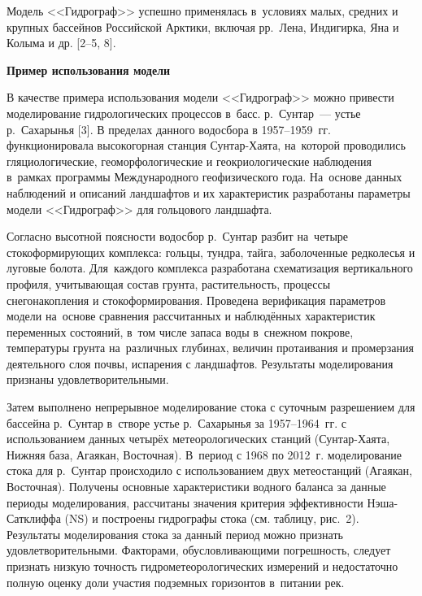 Модель <<Гидрограф>> успешно применялась в~условиях малых, средних и крупных бассейнов Российской Арктики, включая рр.~Лена, Индигирка, Яна и Колыма и др. [2--5, 8].\enlargethispage{\baselineskip}

\textbf{Пример использования модели}

В качестве примера использования модели <<Гидрограф>> можно привести моделирование гидрологических процессов в~басс.  р.~Сунтар~--- устье р.~Сахарынья [3]. В пределах данного водосбора в 1957--1959~гг. функционировала высокогорная станция Сунтар-Хаята, на~которой проводились гляциологические, геоморфологические и геокриологические наблюдения в~рамках программы Международного геофизического года. На~основе данных наблюдений и описаний ландшафтов и их характеристик разработаны параметры модели <<Гидрограф>> для гольцового ландшафта.

Согласно высотной поясности водосбор р.~Сунтар разбит на~четыре стокоформирующих комплекса: гольцы, тундра, тайга, заболоченные редколесья и луговые болота. Для~каждого комплекса разработана схематизация вертикального профиля, учитывающая состав грунта, растительность, процессы снегонакопления и стокоформирования. Проведена верификация параметров модели на~основе сравнения рассчитанных и наблюдённых характеристик переменных состояний, в~том числе запаса воды в~снежном покрове, температуры грунта на~различных глубинах, величин протаивания и промерзания деятельного слоя почвы, испарения с ландшафтов. Результаты моделирования признаны удовлетворительными.

Затем выполнено непрерывное моделирование стока с суточным разрешением для бассейна р.~Сунтар в~створе устье р.~Сахарынья за 1957--1964~гг. с использованием данных четырёх метеорологических станций (Сунтар-Хаята, Нижняя база, Агаякан, Восточная). В~период с 1968 по 2012~г. моделирование стока для р.~Сунтар происходило с использованием двух метеостанций (Агаякан, Восточная). Получены основные характеристики водного баланса за данные периоды моделирования, рассчитаны значения критерия эффективности Нэша-Сатклиффа (NS) и построены гидрографы стока (см. таблицу, рис.~2). Результаты моделирования стока за данный период можно признать удовлетворительными. Факторами, обусловливающими погрешность, следует признать низкую точность гидрометеорологических измерений и недостаточно полную оценку доли участия подземных горизонтов в~питании рек.\enlargethispage{\baselineskip}





